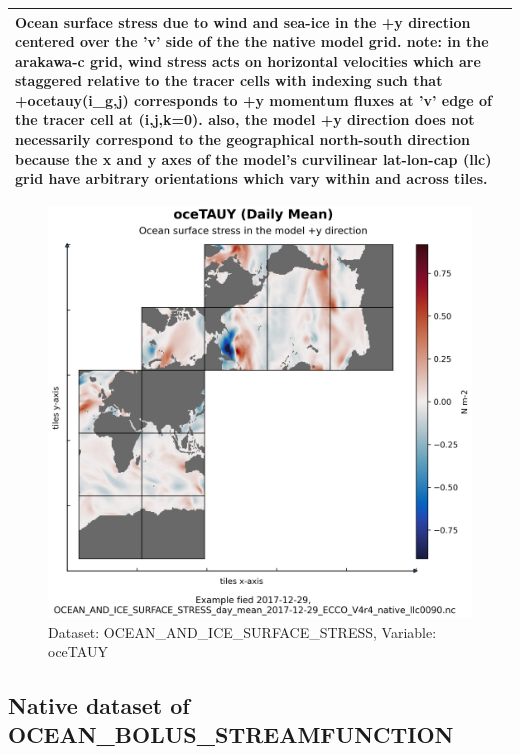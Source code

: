 \begin{longtable}{|m{}|m{}|m{}|m{}|}
\multicolumn{4}{|p{1\textwidth}|}{Ocean surface stress due to wind and sea-ice in the +y direction centered over the 'v' side of the the native model grid. note: in the arakawa-c grid, wind stress acts on horizontal velocities which are staggered relative to the tracer cells with indexing such that +ocetauy(i\_g,j) corresponds to +y momentum fluxes at 'v' edge of the tracer cell at (i,j,k=0). also, the model +y direction does not necessarily correspond to the geographical north-south direction because the x and y axes of the model's curvilinear lat-lon-cap (llc) grid have arbitrary orientations which vary within and across tiles.} \\ \hline
\end{longtable}

\begin{figure}[H]
\centering
\includegraphics[scale=0.55]{../images/plots/native_plots/Ocean_and_Sea-Ice_Surface_Stress/oceTAUY.png}
\caption{Dataset: OCEAN\_AND\_ICE\_SURFACE\_STRESS, Variable: oceTAUY}
\label{tab:table-OCEAN_AND_ICE_SURFACE_STRESS_oceTAUY-Plot}
\end{figure}
\subsection{Native dataset of OCEAN\_BOLUS\_STREAMFUNCTION}
\newp
